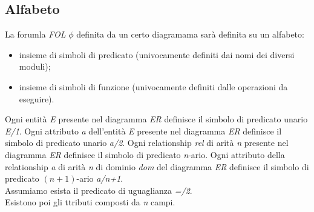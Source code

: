 \subsection{Alfabeto}
La forumla \textit{FOL} $\phi$ definita da un certo diagramama sarà definita su un alfabeto:
\begin{itemize}
	\item insieme di simboli di predicato (univocamente definiti dai nomi dei diversi moduli);
	\item insieme di simboli di funzione (univocamente definiti dalle operazioni da eseguire).
\end{itemize}
Ogni entità \textit{E} presente nel diagramma \textit{ER} definisce il simbolo di predicato unario \textit{E/1}. Ogni attributo \textit{a} dell'entità \textit{E} presente nel diagramma \textit{ER} definisce il simbolo di predicato unario \textit{a/2}.
Ogni relationship \textit{rel} di arità \textit{n} presente nel diagramma \textit{ER} definisce il simbolo di predicato \textit{n}-ario.
Ogni attributo della relationship \textit{a} di arità \textit{n} di dominio \textit{dom} del diagramma \textit{ER} definisce il simbolo di predicato $(n+1)$-ario \textit{a/n+1}. \\
Assumiamo esista il predicato di uguaglianza \textit{=/2}. \\
Esistono poi gli ttributi composti da \textit{n} campi.